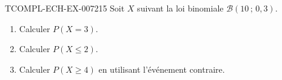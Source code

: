 \begin{exercice}{TCOMPL-ECH-EX-007}{2}{15}
Soit $X$ suivant la loi binomiale $\mathcal{B}(10\,;\,0{,}3)$.
\begin{enumerate}
  \item Calculer $P(X=3)$.
  \item Calculer $P(X\leq2)$.
  \item Calculer $P(X\geq4)$ en utilisant l'événement contraire.
\end{enumerate}
\end{exercice}
